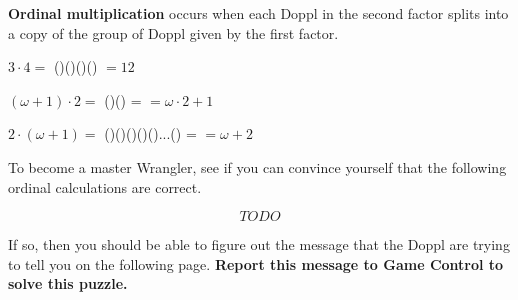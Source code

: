 \newpage

\textbf{Ordinal multiplication} occurs when each Doppl in the second
factor splits into a copy of the group of Doppl given by the first factor.

\(3\cdot 4=\)
(\mappDoppl\mappDoppl\mappDoppl)(\mappDoppl\mappDoppl\mappDoppl)(\mappDoppl\mappDoppl\mappDoppl)(\mappDoppl\mappDoppl\mappDoppl) \(=12\)

\((\omega+1)\cdot 2=\)
(\mappDopplOmega\mappDoppl)(\mappDopplOmega\mappDoppl) =
\mappDopplOmega\mappDopplOmega\mappDoppl{} \(=\omega\cdot 2+1\)

\(2\cdot(\omega+1)=\)
(\mappDoppl\mappDoppl)(\mappDoppl\mappDoppl)(\mappDoppl\mappDoppl)(\mappDoppl\mappDoppl)(\mappDoppl\mappDoppl)...(\mappDoppl\mappDoppl) =
\mappDopplOmega\mappDoppl\mappDoppl \(=\omega+2\)

To become a master \mappMobimon{} Wrangler, see if you can convince yourself
that the following ordinal calculations are correct.

\[TODO\]

If so, then you should be able to figure out the message that the Doppl
are trying to tell you on the following page.
\textbf{Report this message to Game Control to solve this puzzle.}

